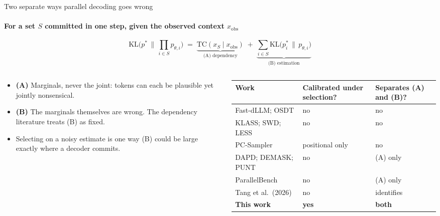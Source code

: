 \documentclass[aspectratio=169,10pt,t]{beamer}
\begin{document}
\begin{frame}{Two separate ways parallel decoding goes wrong}
  \framesubtitle{For a set $S$ committed in one step, given the observed context $x_{\mathrm{obs}}$}
  \vspace{-2.5mm}
  \[
    \mathrm{KL}\Big(p^{*} \,\Big\|\, \prod_{i\in S} p_{\theta,i}\Big)
    \;=\; \underbrace{\mathrm{TC}(x_S \mid x_{\mathrm{obs}})}_{\text{(A) dependency}}
    \;+\; \underbrace{\sum_{i\in S} \mathrm{KL}\big(p^{*}_i \,\big\|\, p_{\theta,i}\big)}_{\text{(B) estimation}}
  \]
  \vspace{-1mm}
  \begin{columns}[T,onlytextwidth]
    \begin{column}{0.4\textwidth}
      \begin{itemize}
        \item \textbf{(A)} Marginals, never the joint: tokens can each be plausible yet
              jointly nonsensical.
        \item \textbf{(B)} The marginals themselves are wrong. The dependency literature
              treats (B) as fixed.
        \item Selecting on a noisy estimate is one way (B) could be large
              \alert{exactly where a decoder commits}.
      \end{itemize}
    \end{column}
    \begin{column}{0.57\textwidth}
      \scriptsize
      \renewcommand{\arraystretch}{1.12}
      \begin{tabularx}{\linewidth}{@{}p{2.9cm} >{\centering\arraybackslash}X >{\centering\arraybackslash}X@{}}
        \toprule
        {\color{ink2}Work} & {\color{ink2}Calibrated under selection?} & {\color{ink2}Separates (A) and (B)?} \\
        \midrule
        Fast-dLLM; OSDT             & no              & no \\
        KLASS; SWD; LESS            & no              & no \\
        PC-Sampler                  & positional only & no \\
        DAPD; DEMASK; PUNT          & no              & (A) only \\
        ParallelBench               & no              & (A) only \\
        Tang et al.\ (2026)         & no              & identifies \\
        \rowcolor{wash}
        \textbf{This work}          & \textbf{yes}    & \textbf{both} \\
        \bottomrule
      \end{tabularx}
    \end{column}
  \end{columns}
\end{frame}
\end{document}
